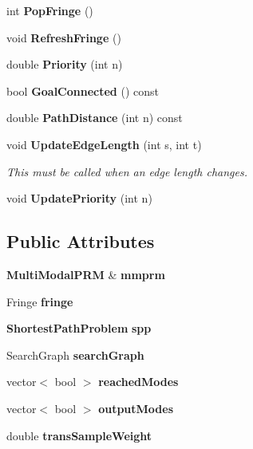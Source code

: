 \begin{DoxyCompactItemize}
\item 
int {\bfseries Pop\+Fringe} ()\label{classIncrementalMMPRM__Search_a94ef3b155d1542003605d718ed2f447e}

\item 
void {\bfseries Refresh\+Fringe} ()\label{classIncrementalMMPRM__Search_ae11eaf5319351ef6ebaf28e748df234a}

\item 
double {\bfseries Priority} (int n)\label{classIncrementalMMPRM__Search_acfeca387d59f1171f7827022ded4a5ad}

\item 
bool {\bfseries Goal\+Connected} () const \label{classIncrementalMMPRM__Search_a6628b83e7d292c55e816b0a7631cb3dd}

\item 
double {\bfseries Path\+Distance} (int n) const \label{classIncrementalMMPRM__Search_a4d32439292429d217fd1bbf5cf2b63f9}

\item 
void {\bf Update\+Edge\+Length} (int s, int t)\label{classIncrementalMMPRM__Search_adec0489f45770b6ee3155e711eb8965d}

\begin{DoxyCompactList}\small\item\em This must be called when an edge length changes. \end{DoxyCompactList}\item 
void {\bf Update\+Priority} (int n)
\end{DoxyCompactItemize}
\subsection*{Public Attributes}
\begin{DoxyCompactItemize}
\item 
{\bf Multi\+Modal\+P\+RM} \& {\bfseries mmprm}\label{classIncrementalMMPRM__Search_ad4cf73a918dc8c182cb06e09a3787e6e}

\item 
Fringe {\bfseries fringe}\label{classIncrementalMMPRM__Search_afa84f941db578af60730106e137fc0b7}

\item 
{\bf Shortest\+Path\+Problem} {\bfseries spp}\label{classIncrementalMMPRM__Search_a9509786a6874901faacc867513fb5893}

\item 
Search\+Graph {\bfseries search\+Graph}\label{classIncrementalMMPRM__Search_aacf0e12da58b95c61c95414f5c9d225f}

\item 
vector$<$ bool $>$ {\bfseries reached\+Modes}\label{classIncrementalMMPRM__Search_aef3902048d8c2aefa6dc8d3cd1fda20b}

\item 
vector$<$ bool $>$ {\bfseries output\+Modes}\label{classIncrementalMMPRM__Search_adb79539a31e6805a8549ae299e6118c7}

\item 
double {\bfseries trans\+Sample\+Weight}\label{classIncrementalMMPRM__Search_a65b3f5f62c062b8742bc5d9dcb39e567}

\end{DoxyCompactItemize}


